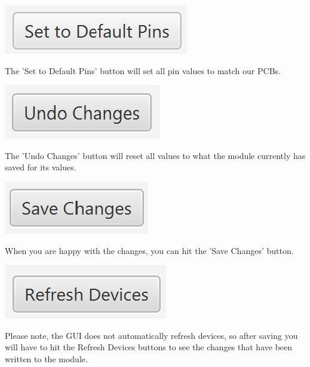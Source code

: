 \documentclass{article}
\begin{document}
\begin{center}
\includegraphics{DefaultBtn}
\end{center}
The 'Set to Default Pins' button will set all pin values to match our PCBs.

\begin{center}
\includegraphics{UndoBtn}
\end{center}
The 'Undo Changes' button will reset all values to what the module currently has saved for its values.

\begin{center}
\includegraphics{SaveBtn}
\end{center}
When you are happy with the changes, you can hit the 'Save Changes' button. 
\begin{center}
\includegraphics{RefreshBtn}
\end{center}
Please note, the GUI does not automatically refresh devices, so after saving you will have to hit the Refresh Devices buttons to see the changes that have been written to the module.
\end{document}
